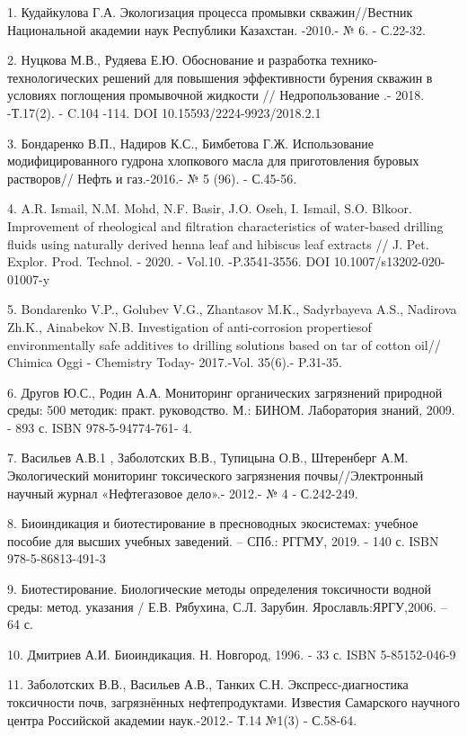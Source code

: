 \begin{refs}
1. Кудайкулова Г.А. Экологизация процесса промывки скважин//Вестник
Национальной академии наук Республики Казахстан. -2010.- № 6. - С.22-32.

2. Нуцкова М.В., Рудяева Е.Ю. Обоснование и разработка
технико-технологических решений для повышения эффективности бурения
скважин в условиях поглощения промывочной жидкости // Недропользование .-
2018. -Т.17(2). - C.104 -114. DOI 10.15593/2224-9923/2018.2.1

3. Бондаренко В.П., Надиров К.С., Бимбетова Г.Ж. Использование
модифицированного гудрона хлопкового масла для приготовления буровых
растворов// Нефть и газ.-2016.- № 5 (96). - С.45-56.

4. A.R. Ismail, N.M. Mohd, N.F. Basir, J.O. Oseh, I. Ismail, S.O.
Blkoor. Improvement of rheological and filtration characteristics of
water-based drilling fluids using naturally derived henna leaf and
hibiscus leaf extracts // J. Pet. Explor. Prod. Technol. - 2020. -
Vol.10. -P.3541-3556. DOI 10.1007/s13202-020-01007-y

5. Bondarenko V.P., Golubev V.G., Zhantasov M.K., Sadyrbayeva A.S.,
Nadirova Zh.K., Ainabekov N.B. Investigation of anti-corrosion
propertiesof environmentally safe additives to drilling solutions based
on tar of cotton oil// Chimica Oggi - Chemistry Today- 2017.-Vol.
35(6).- P.31-35.

6. Другов Ю.С., Родин А.А. Мониторинг органических загрязнений природной
среды: 500 методик: практ. руководство. М.: БИНОМ. Лаборатория знаний,
2009. - 893 с. ISBN 978-5-94774-761- 4.

7. Васильев А.В.1 , Заболотских В.В., Тупицына О.В., Штеренберг А.М.
Экологический мониторинг токсического загрязнения почвы//Электронный
научный журнал «Нефтегазовое дело».- 2012.- № 4 - С.242-249.

8. Биоиндикация и биотестирование в пресноводных экосистемах: учебное
пособие для высших учебных заведений. -- СПб.: РГГМУ, 2019. - 140 с.
ISBN 978-5-86813-491-3

9. Биотестирование. Биологические методы определения токсичности водной
среды: метод. указания / Е.В. Рябухина, С.Л. Зарубин.
Ярославль:ЯРГУ,2006. -- 64 с.
\href{http://www.lib.uniyar.ac.ru/edocs/iuni/20220301.pdf}{}

10. Дмитриев А.И. Биоиндикация. Н. Новгород, 1996. - 33 с. ISBN
5-85152-046-9

11. Заболотских В.В., Васильев А.В., Танких С.Н. Экспресс-диагностика
токсичности почв, загрязнённых нефтепродуктами. Известия Самарского
научного центра Российской академии наук.-2012.- Т.14 №1(3) - С.58-64.
\end{refs}

